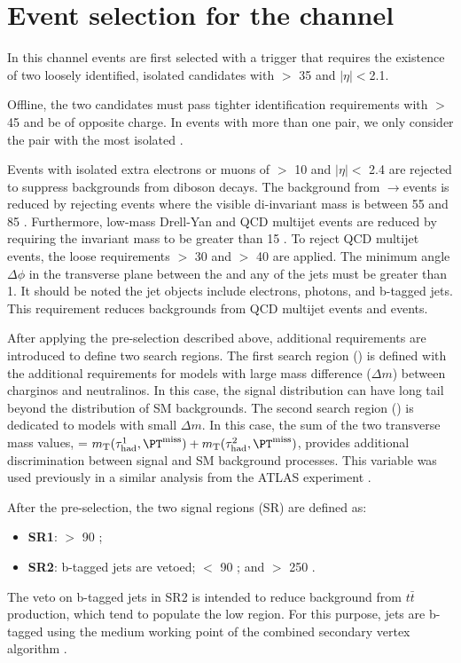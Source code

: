 \section{\texorpdfstring{Event selection for the \tauTau channel}{Event selection for the tau-tau channel}}
\label{sect:tauTauCuts}
In this channel events are first selected with a trigger \cite{Khachatryan:2015hwa,Chatrchyan:2012xi,Chatrchyan:2011nv}
that requires the existence of
two loosely identified, isolated \Tau candidates with \PT $>$ 35 \GeV and $|\eta|<$2.1.   

Offline, the two \Tau candidates must pass tighter identification requirements with \PT $>$ 45 \GeV and be of opposite charge.
In events with more than one \tauTau pair, we only consider the pair with the most isolated \Tau. 

Events with isolated extra electrons or muons of \PT $>$ 10 \GeV and $|\eta| <$ 2.4 
are rejected to suppress %
backgrounds from diboson decays.
The background from \Z$\rightarrow$\tauTau events is reduced by rejecting events where the visible
di-\Tau invariant mass is between 55 and 85 \GeV.  Furthermore, 
low-mass Drell-Yan and QCD multijet events are reduced by requiring the invariant mass to be greater than 15 \GeV.
To reject QCD multijet events, the loose requirements \MPT $>$ 30 \GeV and \mttwo $>$ 40 \GeV are applied.
The minimum angle $\Delta\phi$ in the transverse plane between the \ptvecmiss and any of the jets must be greater than 1. 
It should be noted the jet objects include electrons, photons, \Tau and b-tagged jets.
This requirement reduces backgrounds from QCD multijet events and \wjets events.

After applying the pre-selection described above,
additional requirements are introduced to define two search regions.
The first search region (\binone) is defined with the additional requirements for models with large mass difference ($\Delta m$) 
between charginos and neutralinos.
In this case, the \mttwo signal distribution can have long tail beyond the 
distribution of SM backgrounds.
The second search region (\bintwo) is dedicated to models with small $\Delta m$.  
In this case, the sum of the two transverse mass values, \SumMT = $\mt(\Tau^1,\MPT) + \mt(\Tau^2,\MPT)$, 
provides additional discrimination between signal and SM background processes.
This variable was used previously in a similar analysis from the ATLAS experiment \cite{Aad:2014yka}.

After the pre-selection, the two signal regions (SR) are defined as:
\begin{itemize}
\item {\bf SR1}: \mttwo $>$ 90 \GeV;
\item {\bf SR2}: b-tagged jets are vetoed; \mttwo $<$ 90 \GeV; and \SumMT $>$ 250 \GeV.
\end{itemize}
The veto on b-tagged jets in SR2 is intended to reduce
background from $t\bar{t}$ production, which
tend to populate the low \mttwo region.  For this purpose, jets are b-tagged
using the medium working point of the combined secondary vertex algorithm \cite{Chatrchyan:2012jua}. 

